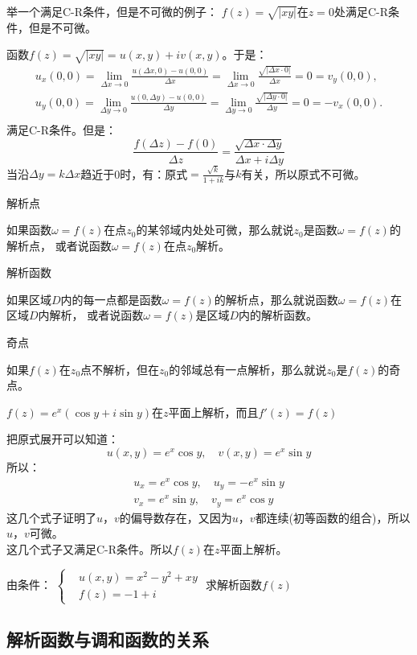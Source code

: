 \documentclass[cn,hazy,blue,14pt,normal]{elegantnote}
\numberwithin{equation}{section}
\begin{document}
\begin{example}
	举一个满足C-R条件，但是不可微的例子：
	$f(z)=\sqrt{|xy|}$在$z=0$处满足C-R条件，但是不可微。
\end{example}
函数$f(z)=\sqrt{|xy|}=u(x,y)+iv(x,y)$。于是：\\
\begin{gather*}
	u_x(0,0)=\lim_{\Delta x\to0}\frac{u(\Delta x,0)-u(0,0)}{\Delta x}=\lim_{\Delta x\to0}\frac{\sqrt{|\Delta x\cdot0|}}{\Delta x}=0=v_y(0,0),\\
	u_y(0,0)=\lim_{\Delta y\to0}\frac{u(0,\Delta y)-u(0,0)}{\Delta y}=\lim_{\Delta y\to0}\frac{\sqrt{|\Delta y\cdot0|}}{\Delta y}=0=-v_x(0,0).\\
\end{gather*}
满足C-R条件。但是：\\
\begin{equation*}
	\frac{f(\Delta z)-f(0)}{\Delta z}=\frac{\sqrt{\Delta x \cdot \Delta y}}{\Delta x+i\Delta y}
\end{equation*}
当沿$\Delta y=k\Delta x$趋近于0时，有：原式$=\frac{\sqrt{k}}{1+ik}$与$k$有关，所以原式不可微。

\begin{definition}
	解析点
\end{definition}
如果函数$\omega=f(z)$在点$z_0$的某邻域内处处可微，那么就说$z_0$是函数$\omega=f(z)$的解析点，
或者说函数$\omega=f(z)$在点$z_0$解析。

\begin{definition}
	解析函数
\end{definition}
如果区域$D$内的每一点都是函数$\omega=f(z)$的解析点，那么就说函数$\omega=f(z)$在区域$D$内解析，
或者说函数$\omega=f(z)$是区域$D$内的解析函数。

\begin{definition}
	奇点
\end{definition}
如果$f(z)$在$z_0$点不解析，但在$z_0$的邻域总有一点解析，那么就说$z_0$是$f(z)$的奇点。

\begin{example}
	$f(z)=e^x(\cos y+i\sin y)$在$z$平面上解析，而且$f'(z)=f(z)$
\end{example}

把原式展开可以知道：
$$
u(x,y)=e^x\cos y,\quad v(x,y)=e^x\sin y
$$
所以：
\begin{gather*}
	u_x=e^x\cos y,\quad u_y=-e^x\sin y\\
	v_x=e^x\sin y,\quad v_y=e^x\cos y
\end{gather*}
这几个式子证明了$u，v$的偏导数存在，又因为$u，v$都连续(初等函数的组合)，所以$u，v$可微。\\
这几个式子又满足C-R条件。所以$f(z)$在$z$平面上解析。\\

\begin{example}
	由条件：
	$\left\{
	\begin{aligned}
		&u(x,y) = x^2-y^2+xy\\
		&f(z) = -1+i
		\end{aligned}
	\right.$
	求解析函数$f(z)$
\end{example}

\newpage
\subsection{解析函数与调和函数的关系}
\end{document}
